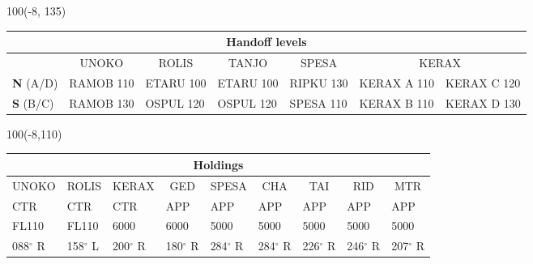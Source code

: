 \documentclass[10pt,landscape,a4paper]{article}
\begin{document}
\begin{textblock}{100}(-8, 135)
  \begin{table}[]
    \begin{tabular}{|l|l|l|l||l|l|l|}
      \multicolumn{7}{c}{\textbf{Handoff levels}}                                                                                                                                      \\ \hline
                       & \multicolumn{1}{c|}{UNOKO} & \multicolumn{1}{c|}{ROLIS} & \multicolumn{1}{c||}{TANJO} & \multicolumn{1}{c|}{SPESA} & \multicolumn{2}{c|}{KERAX}               \\ \hline
      \textbf{N} (A/D) & RAMOB 110                  & ETARU 100                  & ETARU 100                   & RIPKU 130                  & KERAX A 110                & KERAX C 120 \\
      \textbf{S} (B/C) & RAMOB 130                  & OSPUL 120                  & OSPUL 120                   & SPESA 110                  & KERAX B 110                & KERAX D 130 \\ \hline
    \end{tabular}
  \end{table}
\end{textblock}

\begin{textblock}{100}(-8,110)
  \begin{table}[]
    \begin{tabular}{|l|l|l|l|l|l|l|l|l|}

      \multicolumn{9}{c}{\textbf{Holdings}}                                                                                                                                                                                                                     \\ \hline
      \multicolumn{1}{|c|}{UNOKO} & \multicolumn{1}{c|}{ROLIS} & \multicolumn{1}{c|}{KERAX} & \multicolumn{1}{c|}{GED} & \multicolumn{1}{c|}{SPESA} & \multicolumn{1}{c|}{CHA} & \multicolumn{1}{c|}{TAI} & \multicolumn{1}{c|}{RID} & \multicolumn{1}{c|}{MTR} \\ \hline
      CTR                         & CTR                        & CTR                        & APP                      & APP                        & APP                      & APP                      & APP                      & APP                      \\
      FL110                       & FL110                      & 6000                       & 6000                     & 5000                       & 5000                     & 5000                     & 5000                     & 5000                     \\
      088$^\circ$ R               & 158$^\circ$ L              & 200$^\circ$ R              & 180$^\circ$ R            & 284$^\circ$ R              & 284$^\circ$ R            & 226$^\circ$ R            & 246$^\circ$ R            & 207$^\circ$ R            \\ \hline
    \end{tabular}
  \end{table}
\end{textblock}
\end{document}
